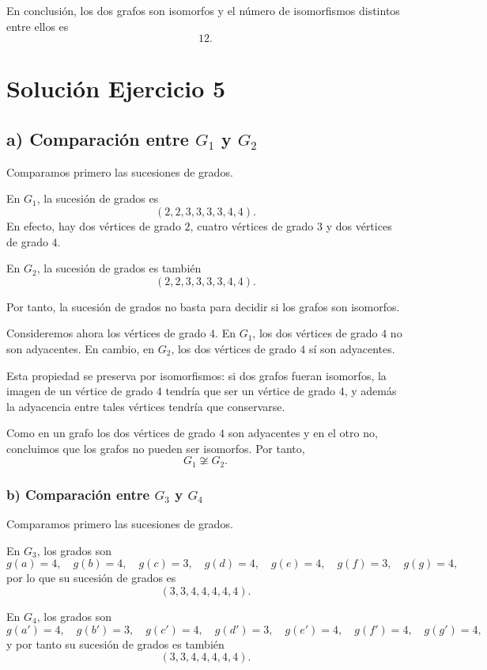 \documentclass[12pt]{article}
\begin{document}
En conclusión, los dos grafos son isomorfos y el número de isomorfismos distintos entre ellos es
\[
\boxed{12}.
\]

\section*{Solución Ejercicio 5}

\subsection*{a) Comparación entre \(G_1\) y \(G_2\)}

Comparamos primero las sucesiones de grados.

En \(G_1\), la sucesión de grados es
\[
(2,2,3,3,3,3,4,4).
\]
En efecto, hay dos vértices de grado \(2\), cuatro vértices de grado \(3\) y dos vértices de grado \(4\).

En \(G_2\), la sucesión de grados es también
\[
(2,2,3,3,3,3,4,4).
\]

Por tanto, la sucesión de grados no basta para decidir si los grafos son isomorfos.

Consideremos ahora los vértices de grado \(4\). En \(G_1\), los dos vértices de grado \(4\) no son adyacentes. En cambio, en \(G_2\), los dos vértices de grado \(4\) sí son adyacentes.

Esta propiedad se preserva por isomorfismos: si dos grafos fueran isomorfos, la imagen de un vértice de grado \(4\) tendría que ser un vértice de grado \(4\), y además la adyacencia entre tales vértices tendría que conservarse.

Como en un grafo los dos vértices de grado \(4\) son adyacentes y en el otro no, concluimos que los grafos no pueden ser isomorfos. Por tanto,
\[
\boxed{G_1 \not\cong G_2.}
\]

\subsubsection*{b) Comparación entre \(G_3\) y \(G_4\)}

Comparamos primero las sucesiones de grados.

En \(G_3\), los grados son
\[
g(a)=4,\quad g(b)=4,\quad g(c)=3,\quad g(d)=4,\quad g(e)=4,\quad g(f)=3,\quad g(g)=4,
\]
por lo que su sucesión de grados es
\[
(3,3,4,4,4,4,4).
\]

En \(G_4\), los grados son
\[
g(a')=4,\quad g(b')=3,\quad g(c')=4,\quad g(d')=3,\quad g(e')=4,\quad g(f')=4,\quad g(g')=4,
\]
y por tanto su sucesión de grados es también
\[
(3,3,4,4,4,4,4).
\]
\end{document}
